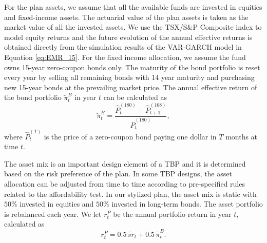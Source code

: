\documentclass{sfuthesis}
\numberwithin{equation}{chapter}
\begin{document}
		\justify
		For the plan assets, we assume that all the available funds are invested in equities and fixed-income assets. The actuarial value of the plan assets is taken as the market value of all the invested assets. We use the TSX/S\&P Composite index to model equity returns and the future evolution of the annual effective returns is obtained directly from the simulation results of the VAR-GARCH model in Equation \eqref{eq:EMR_15}. For the fixed income allocation, we assume the fund owns 15-year zero-coupon bonds only. The maturity of the bond portfolio is reset every year by selling all remaining bonds with 14 year maturity and purchasing new 15-year bonds at the prevailing market price. The annual effective return of the bond portfolio $\tilde{\pi}_{t}^{B}$ in year $t$ can be calculated as
		\begin{equation}
		\label{eq:STBP_17}
		\tilde{\pi}_{t}^{B} = \frac{\hat{P}^{(180)}_{t}-\hat{P}^{(168)}_{t+1}}{\hat{P}^{(180)}_{t}},
		\end{equation}
		where $\hat{P}^{(T)}_{t}$ is the price of a zero-coupon bond paying one dollar in $T$ months at time $t$. 



		\justify
		The asset mix is an important design element of a TBP and it is determined based on the risk preference of the plan. In some TBP designs, the asset allocation can be adjusted from time to time according to pre-specified rules related to the affordability test. In our stylized plan, the asset mix is static with $50\%$ invested in equities and $50\%$ invested in long-term bonds. The asset portfolio is rebalanced each year. We let $r_{t}^P$ be the annual portfolio return in year $t$, calculated as
		\begin{equation}
		\label{eq:STBP_18}
		r_{t}^P =0.5 \, \widetilde{sr}_t + 0.5 \, \tilde{\pi}_{t}^{B}.
		\end{equation}
	
\end{document}
